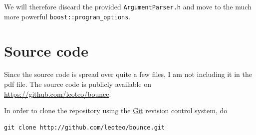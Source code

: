 \documentclass{scrartcl}
\begin{document}
We will therefore discard the provided \verb|ArgumentParser.h| and move
to the much more powerful \verb|boost::program_options|.

\section{Source code}

Since the source code is spread over quite a few files,
I am not including it in the pdf file.
The source code is publicly available on
\url{https://github.com/leoteo/bounce}.

In order to clone the repository using the \href{http://git-scm.com}{Git} 
revision control system, do

\begin{verbatim}
git clone http://github.com/leoteo/bounce.git
\end{verbatim}
\end{document}
